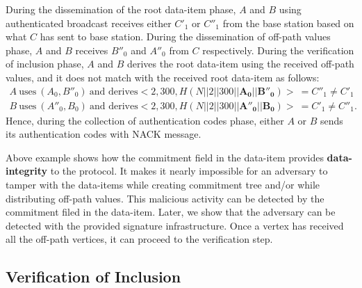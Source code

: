 \begin{exmp}
			During the dissemination of the root data-item phase, $A$ and $B$ using authenticated broadcast receives either $C'_{1}$ or $C''_{1}$ from the base station based on what $C$ has sent to base station.
			During the dissemination of off-path values phase, $A$ and $B$ receives $B''_{0}$ and $A''_{0}$ from $C$ respectively.
			During the verification of inclusion phase, $A$ and $B$ derives the root data-item using the received off-path values, and it does not match with the received root data-item as follows:
			\begin{equation*}
				\begin{array}{l}
					A\ \mbox{uses}\ (A_{0}, B''_{0})\ \mbox{and derives} <2,300,H(N||2||300||\mathbf{A_{0}}||\mathbf{B''_{0}})>\  = C''_{1} \neq C'_{1} \\
					B\ \mbox{uses}\ (A''_{0}, B_{0})\ \mbox{and derives} <2,300,H(N||2||300||\mathbf{A''_{0}}||\mathbf{B_{0}})>\  = C'_{1} \neq C''_{1}.
				\end{array}
			\end{equation*}
			Hence, during the collection of authentication codes phase, either $A$ or $B$ sends its authentication codes with NACK message.
		\end{exmp}
			Above example shows how the commitment field in the data-item provides \textbf{data-integrity} to the protocol.
			It makes it nearly impossible for an adversary to tamper with the data-items while creating commitment tree and/or while distributing off-path values.
			This malicious activity can be detected by the commitment filed in the data-item.
			Later, we show that the adversary can be detected with the provided signature infrastructure.
			Once a vertex has received all the off-path vertices, it can proceed to the verification step.
	
	\subsection{Verification of Inclusion}
	
